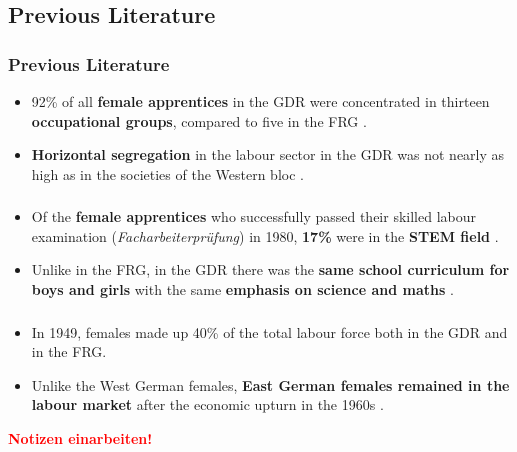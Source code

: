 \documentclass[11pt, aspectratio=1610, xcolor={dvipsnames}]{beamer}
\newcommand{\highlight}[1]{\textbf{\textcolor{PineGreen}{#1}}}
\newcommand{\todo}[1]{\textbf{\textcolor{red}{#1}}}
\begin{document}
	\subsection{Previous Literature}
	\begin{frame}
		\frametitle{Previous Literature}
		
		\begin{itemize}
			\item 92\% of all \highlight{female apprentices} in the GDR were concentrated in thirteen \highlight{occupational groups}, compared to five in the FRG \textcolor{darkgray}{\citep{Menschik1974}}.
			\item \highlight{Horizontal segregation} in the labour sector in the GDR was not nearly as high as in the societies of the Western bloc \textcolor{darkgray}{\citep{Lane1983}}.
		\end{itemize}
		
	\end{frame}
	
	\begin{frame}
		\frametitle{}
		
		\begin{itemize}
			\item Of the \highlight{female apprentices} who successfully passed their skilled labour examination (\emph{Facharbeiterprüfung}) in 1980, \highlight{17\%} were in the \highlight{STEM field} \textcolor{darkgray}{\citep[p. 293]{DDRJahrbuch1981}}.
			\item Unlike in the FRG, in the GDR there was the \highlight{same school curriculum for boys and girls} with the same \highlight{emphasis on science and maths} \textcolor{darkgray}{\citep{FuchsSchuendeln2016, Lippmann2018}}. 
		\end{itemize}
		
	\end{frame}

	\begin{frame}
		\frametitle{}
	
	\begin{itemize}
		\item In 1949, females made up 40\% of the total labour force both in the GDR and in the FRG.
		\item Unlike the West German females, \highlight{East German females remained in the labour market} after the economic upturn in the 1960s \cite{Menschik1974}.
	\end{itemize}
	
	\todo{Notizen einarbeiten!}
	
	\end{frame}
	
\end{document}
